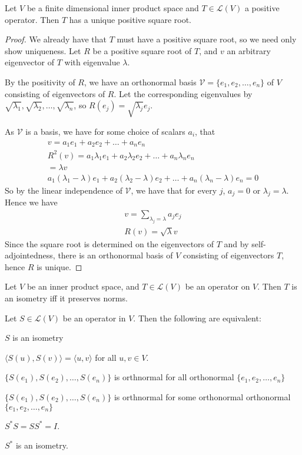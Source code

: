 \documentclass[]{article}
\begin{document}
\begin{thm}
		Let $V$ be a finite dimensional inner product space and $T \in \mathcal{L}(V)$ a positive operator. Then $T$ has a unique positive square root.
\end{thm}

\begin{proof}
		We already have that $T$ must have a positive square root, so we need only show uniqueness. Let $R$ be a positive square root of $T$, and $v$ an arbitrary eigenvector of $T$ with eigenvalue $\lambda$. 

		By the positivity of $R$, we have an orthonormal basis $\mathcal{V} = \{e_1, e_2, \ldots, e_n\}$ of $V$ consisting of eigenvectors of $R$. Let the corresponding eigenvalues by $\sqrt{\lambda_1}, \sqrt{\lambda_2}, \ldots, \sqrt{\lambda_n}$, so $R(e_j) = \sqrt{\lambda_j} e_j$.

		As $\mathcal{V}$ is a basis, we have for some choice of scalars $a_i$, that
		\begin{align*}
				v = a_1 e_1 + a_2 e_2 + \ldots + a_n e_n \\
				R^2(v) = a_1 \lambda_1 e_1 + a_2 \lambda_2 e_2 + \ldots + a_n \lambda_n e_n \\
				= \lambda v \\
				a_1 (\lambda_1 - \lambda) e_1 + a_2 (\lambda_2 - \lambda) e_2 + \ldots + a_n (\lambda_n - \lambda) e_n = 0
		\end{align*}
		So by the linear independence of $\mathcal{V}$, we have that for every $j$, $a_j = 0$ or $\lambda_j = \lambda$. Hence we have
		\begin{align*}
				v = \sum_{\lambda_j = \lambda} a_j e_j \\
				R(v) = \sqrt{\lambda} v
		\end{align*}
		Since the square root is determined on the eigenvectors of $T$ and by self-adjointedness, there is an orthonormal basis of $V$ consisting of eigenvectors $T$, hence $R$ is unique.
\end{proof}

\begin{defi} [Isometry]
		Let $V$ be an inner product space, and $T \in \mathcal{L}(V)$ be an operator on $V$. Then $T$ is an isometry iff it preserves norms.
\end{defi}

\begin{thm}
		Let $S \in \mathcal{L}(V)$ be an operator in $V$. Then the following are equivalent:
		\begin{enumerate*}
		\item $S$ is an isometry
		\item $\langle S(u), S(v) \rangle = \langle u, v \rangle $ for all $u, v \in V$.
		\item $\{S(e_1), S(e_2), \ldots, S(e_n)\}$ is orthnormal for all orthonormal $\{e_1,e_2,\ldots,e_n\}$
		\item $\{S(e_1), S(e_2), \ldots, S(e_n)\}$ is orthnormal for some orthonormal orthonormal $\{e_1,e_2,\ldots,e_n\}$
		\item $S^*S = SS^* = I$.
		\item $S^*$ is an isometry.
		\end{enumerate*}
\end{thm}
\end{document}
